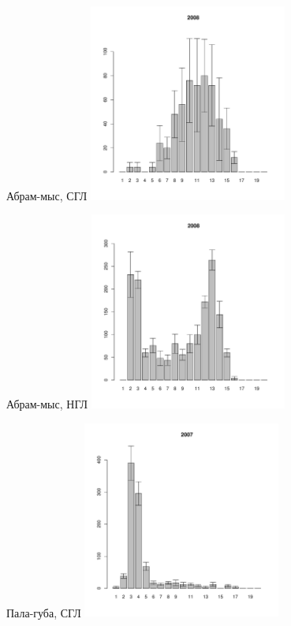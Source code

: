 
	\begin{figure}[hp]
	
	\begin{minipage}[b]{.46\linewidth}
	\begin{center}
	{\tiny Абрам-мыс, СГЛ}
		\includegraphics[width=65mm]{../Barenc_Sea/Abram-mys/middle_2008_.pdf}
	\end{center}
	\end{minipage}
	\hfil %
	\begin{minipage}[b]{.46\linewidth}
	\begin{center}
	{\tiny Абрам-мыс, НГЛ}
		\includegraphics[width=65mm]{../Barenc_Sea/Abram-mys/low_2008_.pdf}
	\end{center}
	\end{minipage}
	\begin{minipage}[b]{.46\linewidth}
	\begin{center}
	{\tiny Пала-губа, СГЛ}
	\includegraphics[width=65mm]{../Barenc_Sea/Pala/middle_2007_.pdf}

\end{center}
\end{minipage}
\end{figure}
